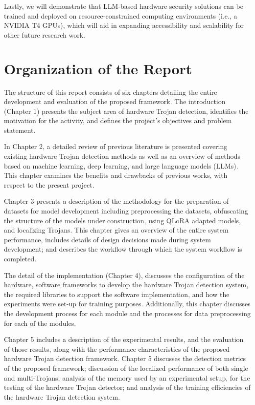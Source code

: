 \documentclass[12pt,a4paper]{report}
\begin{document}
Lastly, we will demonstrate that LLM-based hardware security solutions can be trained and deployed on resource-constrained computing environments (i.e., a NVIDIA T4 GPUs), which will aid in expanding accessibility and scalability for other future research work.

\section{Organization of the Report}

The structure of this report consists of six chapters detailing the entire development and evaluation of the proposed framework. The introduction (Chapter 1) presents the subject area of hardware Trojan detection, identifies the motivation for the activity, and defines the project's objectives and problem statement.

In Chapter 2, a detailed review of previous literature is presented covering existing hardware Trojan detection methods as well as an overview of methods based on machine learning, deep learning, and large language models (LLMs). This chapter examines the benefits and drawbacks of previous works, with respect to the present project.

Chapter 3 presents a description of the methodology for the preparation of datasets for model development including preprocessing the datasets, obfuscating the structure of the models under construction, using QLoRA adapted models, and localizing Trojans. This chapter gives an overview of the entire system performance, includes details of design decisions made during system development; and describes the workflow through which the system workflow is completed.

The detail of the implementation (Chapter 4), discusses the configuration of the hardware, software frameworks to develop the hardware Trojan detection system, the required libraries to support the software implementation, and how the experiments were set-up for training purposes. Additionally, this chapter discusses the development process for each module and the processes for data preprocessing for each of the modules.

Chapter 5 includes a description of the experimental results, and the evaluation of those results, along with the performance characteristics of the proposed hardware Trojan detection framework. Chapter 5 discusses the detection metrics of the proposed framework; discussion of the localized performance of both single and multi-Trojans; analysis of the memory used by an experimental setup, for the testing of the hardware Trojan detector; and analysis of the training efficiencies of the hardware Trojan detection system.
\end{document}
